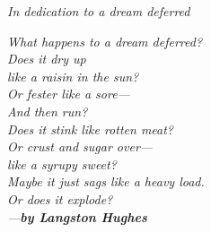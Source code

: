 \newpage
\thispagestyle{empty}
\begin{center}
 \vspace*{6cm}
\textit{\LARGE {In dedication to a dream deferred}}\\
\begin{minipage}{30em}
\vspace*{1cm}
\begin{center}
{\it
What happens to a dream deferred?
\\
Does it dry up\\
like a raisin in the sun?\\
Or fester like a sore—\\
And then run?\\
Does it stink like rotten meat?\\
Or crust and sugar over—\\
like a syrupy sweet?
\\
Maybe it just sags
like a heavy load.
\\
Or does it explode?\\
---\textbf{by Langston Hughes}
 }
  \end{center}
\end{minipage}
 \end{center}

